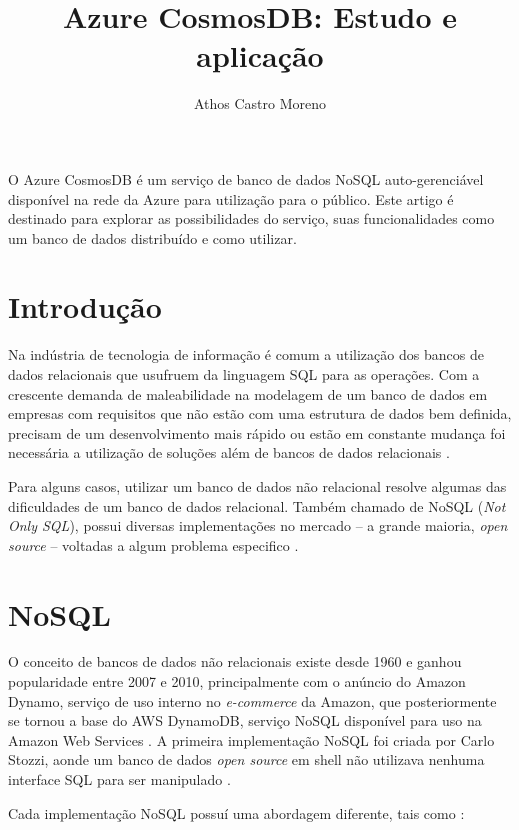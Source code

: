 \documentclass[12pt]{article}
\title{Azure CosmosDB: Estudo e aplicação}
\author{Athos Castro Moreno}
\begin{document}
 

\maketitle

\begin{resumo} 
	O Azure CosmosDB é um serviço de banco de dados NoSQL auto-gerenciável disponível na rede da Azure para utilização para o público. Este artigo é destinado para explorar as possibilidades
	do serviço, suas funcionalidades como um banco de dados distribuído e como utilizar. 
\end{resumo}

\section{Introdução}
Na indústria de tecnologia de informação é comum a utilização dos bancos de dados relacionais que usufruem da linguagem SQL para as operações. Com a crescente demanda
de maleabilidade na modelagem de um banco de dados em empresas com requisitos que não estão com uma estrutura de dados bem definida, precisam de um desenvolvimento mais rápido
ou estão em constante mudança foi necessária a utilização de soluções além de bancos de dados relacionais \cite{Oliveira2011}.

Para alguns casos, utilizar um banco de dados não relacional resolve algumas das dificuldades de um banco de dados relacional. Também chamado de NoSQL (\textit{Not Only SQL}),
possui diversas implementações no mercado -- a grande maioria, \textit{open source} -- voltadas a algum problema especifico \cite{Pokorny2013}.

\section{NoSQL}
O conceito de bancos de dados não relacionais existe desde 1960 e ganhou popularidade entre 2007 e 2010, principalmente com o anúncio do Amazon Dynamo, serviço de uso interno no \textit{e-commerce}
da Amazon, que posteriormente se tornou a base do AWS DynamoDB, serviço NoSQL disponível para uso na Amazon Web Services \cite{DeCandia2007}.
A primeira implementação NoSQL foi criada por Carlo Stozzi, aonde um banco de dados \textit{open source} em shell não utilizava nenhuma interface SQL para ser manipulado \cite{Lith2010}. 

Cada implementação NoSQL possuí uma abordagem diferente, tais como \cite{Lith2010} \cite{Leavitt2010}:
\end{document}
